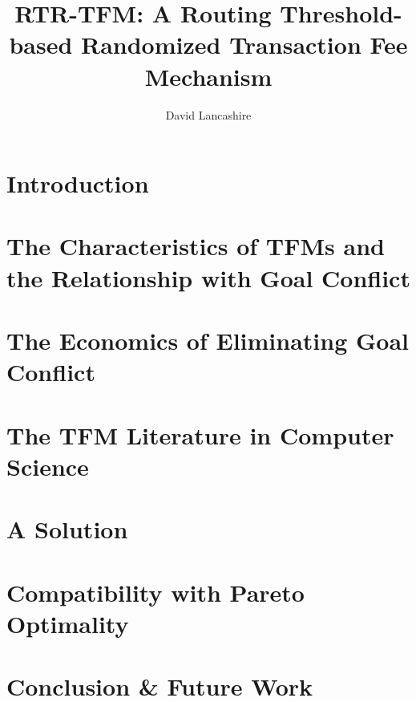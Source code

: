 \documentclass[sigconf,anonymous]{aamas}
\title[Routing Threshold-based Randomized Transaction Fee Mechanism]{RTR-TFM: A Routing Threshold-based Randomized Transaction Fee Mechanism}
\author{David Lancashire}
\affiliation{
  \institution{Proclus Technologies}
  \city{Bangkok}
  \country{Thailand}}
\begin{document}
\pagestyle{fancy}
\fancyhead{}

\maketitle 



\section{Introduction \label{sec::introduction}}


\section{The Characteristics of TFMs and the Relationship with Goal Conflict \label{sec::characteristics}}


\section{The Economics of Eliminating Goal Conflict \label{sec::economics}}


\section{The TFM Literature in Computer Science \label{sec::distsys}}


\section{A Solution \label{sec::solution}}


\section{Compatibility with Pareto Optimality \label{sec::compatibility}}


\section{Conclusion \& Future Work \label{sec::conclusion}}





\cleardoublepage
 


\end{document}
